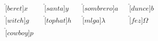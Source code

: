 \documentclass{article}
\begin{document}
\vspace*{-9mm}
\begin{align*}
\hat[beret]{x}&&
\hat[santa]{y}&&
\hat[sombrero]{a}&&
\hat[dunce]{b}\\
\hat[witch]{g}&&
\hat[tophat]{h}&&
\hat[mlga]{\lambda}&&
\hat[fez]{\Omega}\\
\hat[cowboy]{p}
\end{align*}
\end{document}
